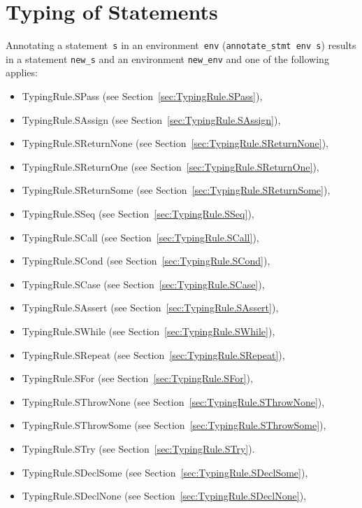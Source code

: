 \documentclass{book}
\begin{document}

\chapter{Typing of Statements}

Annotating a statement~\texttt{s} in an environment~\texttt{env}
(\texttt{annotate\_stmt env s}) results in a statement \texttt{new\_s} and an
environment \texttt{new\_env} and one of the following applies:
\begin{itemize}
\item TypingRule.SPass (see Section~\ref{sec:TypingRule.SPass}),
\item TypingRule.SAssign (see Section~\ref{sec:TypingRule.SAssign}),
\item TypingRule.SReturnNone (see Section~\ref{sec:TypingRule.SReturnNone}),
\item TypingRule.SReturnOne (see Section~\ref{sec:TypingRule.SReturnOne}),
\item TypingRule.SReturnSome (see Section~\ref{sec:TypingRule.SReturnSome}),
\item TypingRule.SSeq (see Section~\ref{sec:TypingRule.SSeq}),
\item TypingRule.SCall (see Section~\ref{sec:TypingRule.SCall}),
\item TypingRule.SCond (see Section~\ref{sec:TypingRule.SCond}),
\item TypingRule.SCase (see Section~\ref{sec:TypingRule.SCase}),
\item TypingRule.SAssert (see Section~\ref{sec:TypingRule.SAssert}),
\item TypingRule.SWhile (see Section~\ref{sec:TypingRule.SWhile}),
\item TypingRule.SRepeat (see Section~\ref{sec:TypingRule.SRepeat}),
\item TypingRule.SFor (see Section~\ref{sec:TypingRule.SFor}),
\item TypingRule.SThrowNone (see Section~\ref{sec:TypingRule.SThrowNone}),
\item TypingRule.SThrowSome (see Section~\ref{sec:TypingRule.SThrowSome}),
\item TypingRule.STry (see Section~\ref{sec:TypingRule.STry}).
\item TypingRule.SDeclSome (see Section~\ref{sec:TypingRule.SDeclSome}),
\item TypingRule.SDeclNone (see Section~\ref{sec:TypingRule.SDeclNone}),
\end{itemize}
\end{document}
